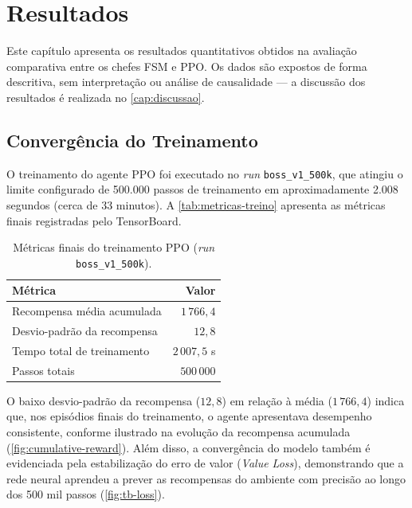 \chapter{Resultados}
\label{cap:resultados}

Este capítulo apresenta os resultados quantitativos obtidos na avaliação
comparativa entre os chefes FSM e PPO. Os dados são expostos de forma
descritiva, sem interpretação ou análise de causalidade --- a discussão dos
resultados é realizada no \autoref{cap:discussao}.

\section{Convergência do Treinamento}
\label{sec:convergencia}

O treinamento do agente PPO foi executado no \textit{run}
\texttt{boss\_v1\_500k}, que atingiu o limite configurado de 500.000 passos de
treinamento em aproximadamente 2.008 segundos (cerca de 33 minutos). A
\autoref{tab:metricas-treino} apresenta as métricas finais registradas pelo
TensorBoard.

\begin{table}[htb]
    \centering
    \caption{Métricas finais do treinamento PPO (\textit{run}
             \texttt{boss\_v1\_500k}).}
    \label{tab:metricas-treino}
    \begin{tabular}{l r}
        \toprule
        \textbf{Métrica}                 & \textbf{Valor} \\
        \midrule
        Recompensa média acumulada       & $1\,766{,}4$ \\
        Desvio-padrão da recompensa      & $12{,}8$ \\
        Tempo total de treinamento       & $2\,007{,}5$ s \\
        Passos totais                    & $500\,000$ \\
        \bottomrule
    \end{tabular}
\end{table}

O baixo desvio-padrão da recompensa ($12{,}8$) em relação à média
($1\,766{,}4$) indica que, nos episódios finais do treinamento, o agente
apresentava desempenho consistente, conforme ilustrado na evolução da recompensa acumulada (\autoref{fig:cumulative-reward}). Além disso, a convergência do modelo também é evidenciada pela estabilização do erro de valor (\textit{Value Loss}), demonstrando que a rede neural aprendeu a prever as recompensas do ambiente com precisão ao longo dos 500 mil passos (\autoref{fig:tb-loss}).

